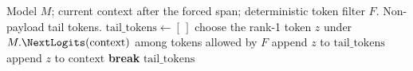 \begin{algorithm}[H]
\caption{Greedy continuation policy used after each segmented forced span; the generated tail carries no payload ranks and is ignored by the decoder.}
\label{alg:tail}
\begin{algorithmic}[1]
\Require Model \(M\); current context after the forced span; deterministic token filter \(F\).
\Ensure Non-payload tail tokens.
\State \(\mathrm{tail\_tokens} \gets [\,]\)
    \State choose the rank-1 token \(z\) under \(M.\NextLogits(\mathrm{context})\) among tokens allowed by \(F\)
    \State append \(z\) to \(\mathrm{tail\_tokens}\)
    \State append \(z\) to \(\mathrm{context}\)
        \State \textbf{break}
    \EndIf
\EndWhile
\State \Return \(\mathrm{tail\_tokens}\)
\end{algorithmic}
\end{algorithm}
